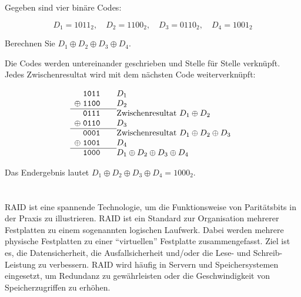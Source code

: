 \begin{myexercise}
    Gegeben sind vier binäre Codes:

    \[
        D_1 = 1011_2, \quad D_2 = 1100_2, \quad D_3 = 0110_2, \quad D_4 = 1001_2
    \]

    Berechnen Sie \( D_1 \oplus D_2 \oplus D_3 \oplus D_4 \).

    \begin{myanswer}
        Die Codes werden untereinander geschrieben und Stelle für Stelle
        verknüpft. Jedes Zwischenresultat wird mit dem nächsten Code
        weiterverknüpft:

        \[
            \begin{array}{r@{\;}l@{\qquad}l}
                       & \mathtt{1011} & D_1                                           \\
                \oplus & \mathtt{1100} & D_2                                           \\ \cline{1-2}
                       & \mathtt{0111} & \text{Zwischenresultat } D_1 \oplus D_2         \\
                \oplus & \mathtt{0110} & D_3                                           \\ \cline{1-2}
                       & \mathtt{0001} & \text{Zwischenresultat } D_1 \oplus D_2 \oplus D_3 \\
                \oplus & \mathtt{1001} & D_4                                           \\ \cline{1-2}
                       & \mathtt{1000} & D_1 \oplus D_2 \oplus D_3 \oplus D_4
            \end{array}
        \]

        Das Endergebnis lautet \(D_1 \oplus D_2 \oplus D_3 \oplus D_4 = 1000_2\).

    \end{myanswer}
\end{myexercise}


\section{}

\gls{RAID} ist eine spannende Technologie, um die Funktionsweise von Paritätsbits in der Praxis zu illustrieren. \gls{RAID} ist ein Standard zur Organisation mehrerer Festplatten zu einem sogenannten logischen Laufwerk. Dabei werden mehrere physische Festplatten zu einer \enquote{virtuellen} Festplatte zusammengefasst. Ziel ist es, die Datensicherheit, die Ausfallsicherheit und/oder die Lese- und Schreib-Leistung zu verbessern. \gls{RAID} wird häufig in Servern und Speichersystemen eingesetzt, um Redundanz zu gewährleisten oder die Geschwindigkeit von Speicherzugriffen zu erhöhen.

